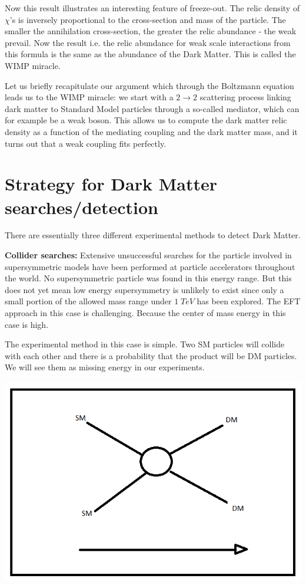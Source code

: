 \documentclass[12pt]{report}
\begin{document}
Now this result illustrates an interesting feature of freeze-out. The relic density of $\chi$'s is inversely proportional to the cross-section and mass of the particle. The smaller the annihilation cross-section, the greater the relic abundance - the weak prevail.
 Now the result i.e. the relic abundance for weak scale interactions from this formula is the same as the abundance of the Dark Matter. This is called the WIMP miracle.
 
 Let us briefly recapitulate our argument which through the Boltzmann equation leads us to the WIMP miracle: we start with a $2 \longrightarrow 2$ scattering process linking dark matter to Standard Model particles through a so-called mediator, which can for example be a weak boson. This allows us to compute the dark matter relic density as a function of the mediating coupling and the dark matter mass, and it turns out that a weak coupling fits perfectly.

\newpage

\chapter{Strategy for Dark Matter searches/detection}
There are essentially three different experimental methods to detect Dark Matter.

\textbf{Collider searches:} Extensive unsuccessful searches for the particle involved in supersymmetric models have been performed at particle accelerators throughout the world. No supersymmetric particle was found in this energy range. But this does not yet mean low energy supersymmetry is unlikely to exist since only a small portion of the allowed mass range under $1\; TeV$ has been explored. The EFT approach in this case is challenging. Because the center of mass energy in this case is high.

The experimental method in this case is simple. Two SM particles will collide with each other and there is a probability that the product will be DM particles. We will see them as missing energy in our experiments.

\begin{center}
\includegraphics[scale=0.3]{collider_searches1.png}
\end{center}
\end{document}
